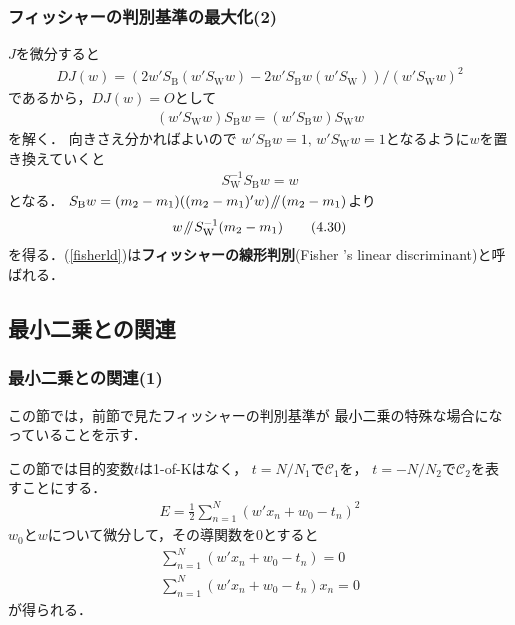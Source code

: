 \documentclass[10pt,%
hyperref={unicode}]{beamer}
\newcommand{\parallelsl}{\mathbin{\!/\mkern-5mu/\!}}
\newcommand{\braref}[1]{{\fontfamily{cmr}\selectfont (\ref{#1})}}
\begin{document}
\begin{frame}
    \frametitle{フィッシャーの判別基準の最大化(2)}
    $J$を微分すると
    \begin{align*}
        DJ(w) = (2 w'S_\mathrm{B}(w'S_\mathrm{W}w)
        - 2 w'S_\mathrm{B}w(w'S_\mathrm{W}))
                     \big/(w'S_\mathrm{W}w)^2
    \end{align*}
    であるから，$DJ(w)=O$として
    \begin{align}
        (w'S_\mathrm{W}w)S_\mathrm{B}w = (w'S_\mathrm{B}w)S_\mathrm{W}w \tag{4.29}
    \end{align}
    を解く．
    向きさえ分かればよいので
    $w'S_\mathrm{B}w = 1,\,w'S_\mathrm{W}w = 1$となるように$w$を置き換えていくと
    \begin{align*}
        S_\mathrm{W}^{-1} S_\mathrm{B}w = w
    \end{align*}
    となる．
    $S_\mathrm{B}w = (m_2 - m_1)((m_2 - m_1)'w) \parallelsl (m_2 - m_1)$より
    \begin{align}
        w \parallelsl S_\mathrm{W}^{-1} (m_2 - m_1) \tag{4.30} \label{fisherld}
    \end{align}
    を得る．\braref{fisherld}は\textbf{フィッシャーの線形判別}(Fisher%
    {'}s linear discriminant)と呼ばれる．
\end{frame}

\subsection{最小二乗との関連}
\begin{frame}
    \frametitle{最小二乗との関連(1)}
    この節では，前節で見たフィッシャーの判別基準が
    最小二乗の特殊な場合になっていることを示す．

    \bigskip

    この節では目的変数$t$は1-of-Kはなく，
    $t = N / N_1$で$\mathcal{C}_1$を，
    $t = - N / N_2$で$\mathcal{C}_2$を表すことにする．
    \begin{align*}
        E = \frac{1}{2}\sum_{n = 1}^N (w' x_n + w_0 - t_n)^2
    \end{align*}
    $w_0$と$w$について微分して，その導関数を$0$とすると
    \begin{gather*}
        \sum_{n = 1}^N (w'x_n + w_0 - t_n) = 0 \tag{4.32} \label{w01}\\
        \sum_{n = 1}^N (w'x_n + w_0 - t_n)x_n = 0 \tag{4.33} \label{w02}
    \end{gather*}
    が得られる．
\end{frame}
\end{document}
